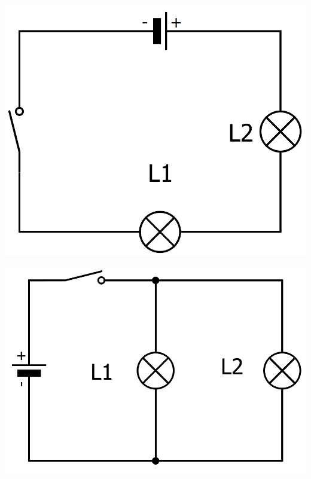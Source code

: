 \documentclass[12pt,a4paper]{article}
\begin{document}
\begin{multicols}{2}
	\begin{center}
		\includegraphics[scale=0.25]{img/serie}
	\end{center}
	
	\begin{center}
		\includegraphics[scale=0.25]{img/drv}
	\end{center}
\end{multicols}
\appendix

\end{document}
